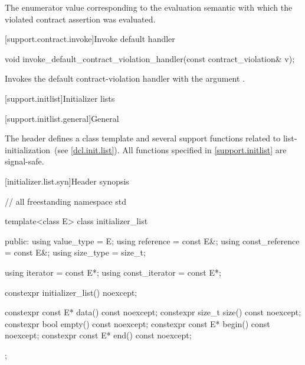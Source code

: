\begin{itemdescr}

\pnum
\returns
The enumerator value
corresponding to
the evaluation semantic with which
the violated contract assertion was evaluated.

\end{itemdescr}

[support.contract.invoke]{Invoke default handler}

\begin{itemdecl}
void invoke_default_contract_violation_handler(const contract_violation& v);
\end{itemdecl}

\begin{itemdescr}
\pnum
\effects
Invokes the default contract-violation handler
with the argument .

\end{itemdescr}

[support.initlist]{Initializer lists}

[support.initlist.general]{General}

\pnum
The header  defines a class template and several
support functions related to list-initialization~(see \ref{dcl.init.list}).
%
All functions specified in \ref{support.initlist} are signal-safe.

[initializer.list.syn]{Header  synopsis}
%
%
%

\begin{codeblock}
// all freestanding
namespace std {
  template<class E> class initializer_list {
  public:
    using value_type      = E;
    using reference       = const E&;
    using const_reference = const E&;
    using size_type       = size_t;

    using iterator        = const E*;
    using const_iterator  = const E*;

    constexpr initializer_list() noexcept;

    constexpr const E* data() const noexcept;
    constexpr size_t size() const noexcept;
    constexpr bool empty() const noexcept;
    constexpr const E* begin() const noexcept;
    constexpr const E* end() const noexcept;
  };
}
\end{codeblock}

